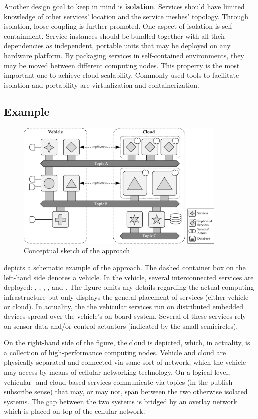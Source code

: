 Another design goal to keep in mind is \textbf{isolation}. Services should have limited knowledge of other services' location and the service meshes' topology. Through isolation, loose coupling is further promoted. One aspect of isolation is self-containment. Service instances should be bundled together with all their dependencies as independent, portable units that may be deployed on any hardware platform. By packaging services in self-contained environments, they may be moved between different computing nodes. This property is the most important one to achieve cloud scalability. Commonly used tools to facilitate isolation and portability are virtualization and containerization.
%
%
%
%
%
%
%
%
%
%
\subsection{Example}
\begin{figure}[htpb]
  \centering
  \includegraphics[width=0.9\textwidth]{figures/idea.pdf}
  \caption[Conceptual sketch of the approach]{Conceptual sketch of the approach}\label{fig:idea}
\end{figure}
 depicts a schematic example of the approach. The dashed container box on the left-hand side denotes a vehicle. In the vehicle, several interconnected services are deployed: , , , , and . The figure omits any details regarding the actual computing infrastructure but only displays the general placement of services (either vehicle or cloud). In actuality, the the vehicular services run on distributed embedded devices spread over the vehicle's on-board system. Several of these services rely on sensor data and/or control actuators (indicated by the small semicircles).

On the right-hand side of the figure, the cloud is depicted, which, in actuality, is a collection of high-performance computing nodes. Vehicle and cloud are physically separated and connected via some sort of network, which the vehicle may access by means of cellular networking technology. On a logical level, vehicular- and cloud-based services communicate via topics (in the publish-subscribe sense) that may, or may not, span between the two otherwise isolated systems. The gap between the two systems is bridged by an overlay network which is placed on top of the cellular network.


